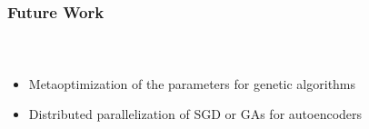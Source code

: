
\begin{frame}[t]
	\frametitle{Future Work}
	\framesubtitle{~~}  %
	\begin{itemize}
		\item Metaoptimization of the parameters for genetic algorithms
		\item Distributed parallelization of SGD or GAs for autoencoders
	\end{itemize}

\end{frame}


